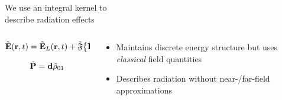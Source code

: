 \documentclass[12pt,usenames,dvipsnames]{beamer}
\begin{document}
\begin{frame}{We use an integral kernel to \\ describe radiation effects}
  \begin{columns}
    \begin{column}{0.5\textwidth}
      \begin{equation*}
        \tilde{\vb{E}}(\vb{r}, t) = \tilde{\vb{E}}_L(\vb{r}, t) + \tilde{\mathfrak{F}}\qty{\tilde{\vb{P}}(\vb{r}, t)}
      \end{equation*}

      \begin{equation*}
        \tilde{\vb{P}} = \vb{d} \tilde{\rho}_{01} 
      \end{equation*}
    \end{column}
    \begin{column}{0.5\textwidth}
      \begin{itemize}
        \item Maintains discrete energy structure but uses \emph{classical} field quantities
        \item Describes radiation without near-/far-field approximations
      \end{itemize}
    \end{column}
  \end{columns}
  \vfill
\end{frame}
\end{document}
